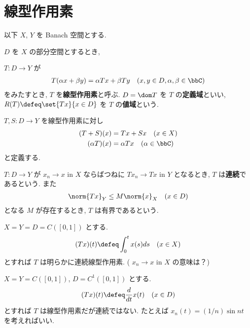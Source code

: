 \documentclass[openany, a4paper, oneside]{jsbook}
\begin{document}
\section{線型作用素}

以下 $X$, $Y$ を Banach 空間とする.
\begin{defn}
$D$ を $X$ の部分空間とするとき,

$T \colon D \to Y$ が
\begin{align}
 T (\alpha x + \beta y)
 =
 \alpha Tx + \beta Ty
 \quad (x, y \in D, \alpha, \beta \in \bbC)
\end{align}
をみたすとき, $T$ を\textbf{線型作用素}と呼ぶ.
$D = \dom T$ を $T$ の\textbf{定義域}といい,
$R(T) \defeq \set{Tx}{x \in D}$ を $T$ の\textbf{値域}という.

$T, S \colon D \to Y$ を線型作用素に対し
\begin{align}
 (T + S)(x)
 &=
 Tx + Sx \quad (x \in X) \\
 (\alpha T)(x)
 &= \alpha Tx \quad (\alpha \in \bbC)
\end{align}
と定義する.

$T \colon D \to Y$ が
$x_n \to x$ in $X$ ならばつねに $Tx_n \to Tx$  in  $Y$
となるとき, $T$ は\textbf{連続}であるという.
また
\begin{align}
 \norm{Tx}_Y
 \leq
 M \norm{x}_X \quad (x \in D)
\end{align}
となる $M$ が存在するとき, $T$ は有界であるという.
\end{defn}

\begin{ex}
$X=Y=D=C([0, 1])$ とする.
\begin{align}
 (Tx)(t)
 \defeq
 \int_0^t x(s)ds \quad (x \in X)
\end{align}
とすれば $T$ は明らかに連続線型作用素.
( $x_n \to x$  in  $X$  の意味は？)
\end{ex}
\begin{ex}
$X=Y=C([0, 1])$, $D = C^1([0, 1])$ とする.
\begin{align}
 (Tx)(t)
 \defeq
 \frac{d}{dt}x(t) \quad (x \in D)
\end{align}
とすれば $T$ は線型作用素だが連続ではない.
たとえば $x_n(t) = (1/n) \sin nt$ を考えればいい.
\end{ex}
\end{document}

